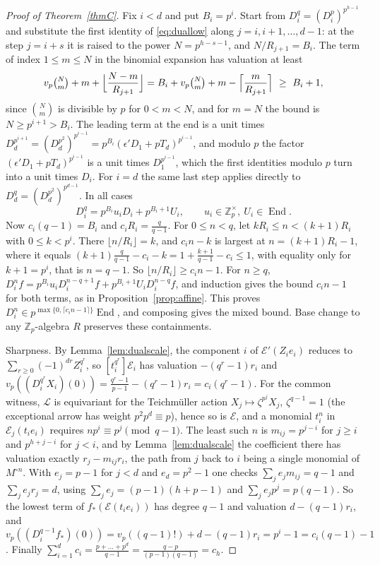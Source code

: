 \documentclass[11pt]{amsart}
\theoremstyle{definition}
\theoremstyle{remark}
\newcommand{\Z}{\mathbb Z}
\newcommand{\vp}{v_p}
\DeclareMathOperator{\End}{End}
\begin{document}
\begin{proof}[Proof of Theorem~\ref{thmC}]
Fix $i<d$ and put $B_i=p^i$. Start from $D_i^q=(D_i^p)^{p^{h-1}}$ and substitute the first identity of \eqref{eq:duallow} along $j=i,i+1,\dots,d-1$: at the step $j=i+s$ it is raised to the power $N=p^{h-s-1}$, and $N/R_{j+1}=B_i$. The term of index $1\le m\le N$ in the binomial expansion has valuation at least
\[
 \vp\tbinom Nm+m+\Bigl\lfloor\frac{N-m}{R_{j+1}}\Bigr\rfloor=B_i+\vp\tbinom Nm+m-\Bigl\lceil\frac m{R_{j+1}}\Bigr\rceil\ \ge\ B_i+1,
\]
since $\binom Nm$ is divisible by $p$ for $0<m<N$, and for $m=N$ the bound is $N\ge p^{i+1}>B_i$. The leading term at the end is a unit times $D_d^{p^{i+1}}=(D_d^{p^2})^{p^{i-1}}=p^{B_i}(\epsilon'D_1+pT_d)^{p^{i-1}}$, and modulo $p$ the factor $(\epsilon'D_1+pT_d)^{p^{i-1}}$ is a unit times $D_1^{p^{i-1}}$, which the first identities modulo $p$ turn into a unit times $D_i$. For $i=d$ the same last step applies directly to $D_d^q=(D_d^{p^2})^{p^{d-1}}$. In all cases
\[
 D_i^q=p^{B_i}u_iD_i+p^{B_i+1}U_i,\qquad u_i\in\Z_p^\times,\ U_i\in\End .
\]
Now $c_i(q-1)=B_i$ and $c_iR_i=\frac q{q-1}$. For $0\le n<q$, let $kR_i\le n<(k+1)R_i$ with $0\le k<p^i$. There $\lfloor n/R_i\rfloor=k$, and $c_in-k$ is largest at $n=(k+1)R_i-1$, where it equals $(k+1)\frac q{q-1}-c_i-k=1+\frac{k+1}{q-1}-c_i\le1$, with equality only for $k+1=p^i$, that is $n=q-1$. So $\lfloor n/R_i\rfloor\ge c_in-1$. For $n\ge q$, $D_i^nf=p^{B_i}u_iD_i^{n-q+1}f+p^{B_i+1}U_iD_i^{n-q}f$, and induction gives the bound $c_in-1$ for both terms, as in Proposition~\ref{prop:affine}. This proves $D_i^n\in p^{\max\{0,\lceil c_in-1\rceil\}}\End$, and composing gives the mixed bound. Base change to any $\Z_p$-algebra $R$ preserves these containments.

Sharpness. By Lemma~\ref{lem:dualscale}, the component $i$ of $\mathcal E'(Z_ie_i)$ reduces to $\sum_{r\ge0}(-1)^{dr}Z_i^{q^r}$, so $[t_i^{q^r}]\mathcal E_i$ has valuation $-(q^r-1)r_i$ and $\vp((D_i^{q^r}X_i)(0))=\frac{q^r-1}{p-1}-(q^r-1)r_i=c_i(q^r-1)$. For the common witness, $\mathcal L$ is equivariant for the Teichm\"uller action $X_j\mapsto\zeta^{p^j}X_j$, $\zeta^{q-1}=1$ (the exceptional arrow has weight $p^2p^d\equiv p$), hence so is $\mathcal E$, and a monomial $t_i^n$ in $\mathcal E_j(t_ie_i)$ requires $np^i\equiv p^j\pmod{q-1}$. The least such $n$ is $m_{ij}=p^{j-i}$ for $j\ge i$ and $p^{h+j-i}$ for $j<i$, and by Lemma~\ref{lem:dualscale} the coefficient there has valuation exactly $r_j-m_{ij}r_i$, the path from $j$ back to $i$ being a single monomial of $M^{\circ n}$. With $e_j=p-1$ for $j<d$ and $e_d=p^2-1$ one checks $\sum_je_jm_{ij}=q-1$ and $\sum_je_jr_j=d$, using $\sum_je_j=(p-1)(h+p-1)$ and $\sum_je_jp^j=p(q-1)$. So the lowest term of $f_*(\mathcal E(t_ie_i))$ has degree $q-1$ and valuation $d-(q-1)r_i$, and $\vp((D_i^{q-1}f_*)(0))=\vp((q-1)!)+d-(q-1)r_i=p^i-1=c_i(q-1)-1$. Finally $\sum_{i=1}^dc_i=\frac{p+\dots+p^d}{q-1}=\frac{q-p}{(p-1)(q-1)}=c_h$.
\end{proof}
\end{document}
